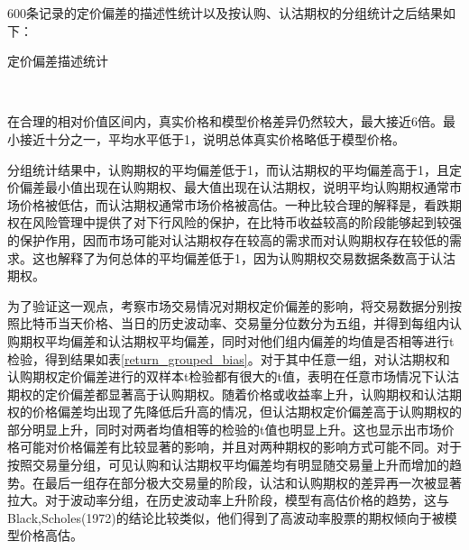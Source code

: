 600条记录的定价偏差的描述性统计以及按认购、认沽期权的分组统计之后结果如下：
~\\
\begin{center}
\begin{threeparttable}[H]
\begin{small}
\caption{定价偏差描述统计}
\label{tab:option_bias_group}
    
    
\end{small} 
\end{threeparttable}
\end{center}
~\\
\par{在合理的相对价值区间内，真实价格和模型价格差异仍然较大，最大接近6倍。最小接近十分之一，平均水平低于1，说明总体真实价格略低于模型价格。}
\par{分组统计结果中，认购期权的平均偏差低于1，而认沽期权的平均偏差高于1，且定价偏差最小值出现在认购期权、最大值出现在认沽期权，说明平均认购期权通常市场价格被低估，而认沽期权通常市场价格被高估。一种比较合理的解释是，看跌期权在风险管理中提供了对下行风险的保护，在比特币收益较高的阶段能够起到较强的保护作用，因而市场可能对认沽期权存在较高的需求而对认购期权存在较低的需求。这也解释了为何总体的平均偏差低于1，因为认购期权交易数据条数高于认沽期权。}
\par{为了验证这一观点，考察市场交易情况对期权定价偏差的影响，将交易数据分别按照比特币当天价格、当日的历史波动率、交易量分位数分为五组，并得到每组内认购期权平均偏差和认沽期权平均偏差，同时对他们组内偏差的均值是否相等进行t检验，得到结果如表\ref{return_grouped_bias}。对于其中任意一组，对认沽期权和认购期权定价偏差进行的双样本t检验都有很大的t值，表明在任意市场情况下认沽期权的定价偏差都显著高于认购期权。随着价格或收益率上升，认购期权和认沽期权的价格偏差均出现了先降低后升高的情况，但认沽期权定价偏差高于认购期权的部分明显上升，同时对两者均值相等的检验的t值也明显上升。这也显示出市场价格可能对价格偏差有比较显著的影响，并且对两种期权的影响方式可能不同。对于按照交易量分组，可见认购和认沽期权平均偏差均有明显随交易量上升而增加的趋势。在最后一组存在部分极大交易量的阶段，认沽和认购期权的差异再一次被显著拉大。对于波动率分组，在历史波动率上升阶段，模型有高估价格的趋势，这与Black,Scholes(1972)的结论比较类似，他们得到了高波动率股票的期权倾向于被模型价格高估\cite{J-1972}。}
